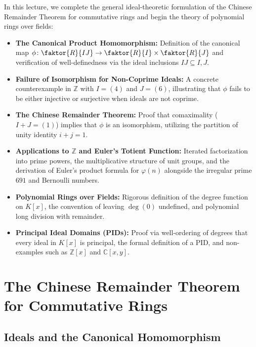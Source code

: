 \begin{overview}
In this lecture, we complete the general ideal-theoretic formulation of the Chinese Remainder Theorem for commutative rings and begin the theory of polynomial rings over fields:
\begin{itemize}
    \item \textbf{The Canonical Product Homomorphism:} Definition of the canonical map $\phi \colon \faktor{R}{IJ} \to \faktor{R}{I} \times \faktor{R}{J}$ and verification of well-definedness via the ideal inclusions $IJ \subseteq I, J$.
    \item \textbf{Failure of Isomorphism for Non-Coprime Ideals:} A concrete counterexample in $\mathbb{Z}$ with $I = (4)$ and $J = (6)$, illustrating that $\phi$ fails to be either injective or surjective when ideals are not coprime.
    \item \textbf{The Chinese Remainder Theorem:} Proof that comaximality ($I + J = (1)$) implies that $\phi$ is an isomorphism, utilizing the partition of unity identity $i + j = 1$.
    \item \textbf{Applications to $\mathbb{Z}$ and Euler's Totient Function:} Iterated factorization into prime powers, the multiplicative structure of unit groups, and the derivation of Euler's product formula for $\varphi(n)$ alongside the irregular prime $691$ and Bernoulli numbers.
    \item \textbf{Polynomial Rings over Fields:} Rigorous definition of the degree function on $K[x]$, the convention of leaving $\deg(0)$ undefined, and polynomial long division with remainder.
    \item \textbf{Principal Ideal Domains (PIDs):} Proof via well-ordering of degrees that every ideal in $K[x]$ is principal, the formal definition of a PID, and non-examples such as $\mathbb{Z}[x]$ and $\mathbb{C}[x, y]$.
\end{itemize}
\end{overview}

\section{The Chinese Remainder Theorem for Commutative Rings}

\subsection{Ideals and the Canonical Homomorphism}

